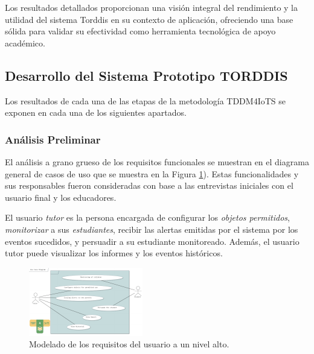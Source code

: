 \documentclass[a4paper,fleqn]{cas-sc}
\begin{document}
		Los resultados detallados proporcionan una visión integral del rendimiento y la utilidad del sistema Torddis en su contexto de aplicación, ofreciendo una base sólida para validar su efectividad como herramienta tecnológica de apoyo académico.

		\subsection{Desarrollo del Sistema Prototipo TORDDIS}
			Los resultados de cada una de las etapas de la metodología TDDM4IoTS \citep{Guerrero-Ulloa2020TDDM4IoTS} se exponen en cada una de los siguientes apartados.
			
			\subsubsection{Análisis Preliminar}
				El análisis a grano grueso de los requisitos funcionales se muestran en el diagrama general de casos de uso que se muestra en la Figura \ref{fig:UseCaseDiagram}). Estas funcionalidades y sus responsables fueron consideradas con base a las entrevistas iniciales con el usuario final y los educadores.
				
				El usuario \textit{tutor} es la persona encargada de configurar los \textit{objetos permitidos}, \textit{monitorizar} a sus \textit{estudiantes}, recibir las alertas emitidas por el sistema por los eventos sucedidos, y persuadir a su estudiante monitoreado. Además, el usuario tutor puede visualizar los informes y los eventos históricos.
				
				\begin{figure}[h]
					\centering
					\includegraphics[frame,scale=0.5, width=\linewidth]{figs/Figure_2}
					\caption{Modelado de los requisitos del usuario a un nivel alto.\label{fig:UseCaseDiagram}}
				\end{figure} 
				
\end{document}
